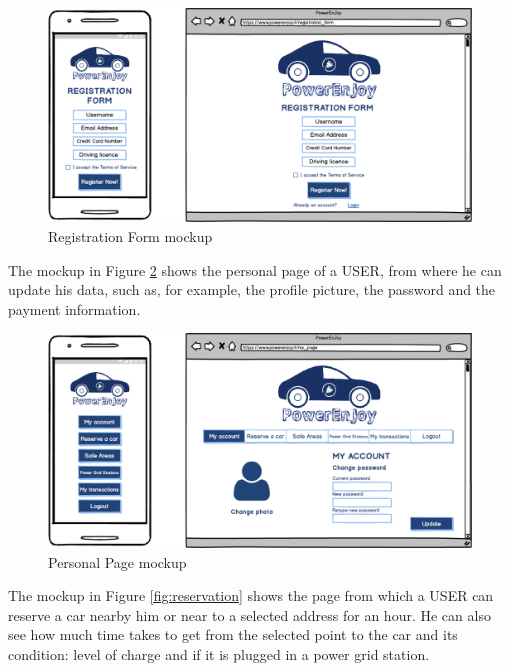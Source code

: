 \vspace{80pt}

\begin{figure}[htbp]
\centering
\includegraphics[width=\textwidth]{Images/Mockups/RegistrationForm}
\caption{Registration Form mockup}
\label{fig:registration}
\end{figure}
\clearpage

\newline
The mockup in Figure \ref{fig:mypage} shows the personal page of a USER, from where he can update his data, such as, for example, the profile picture, the password and the payment information.

\vspace{80pt}

\begin{figure}[htbp]
\centering
\includegraphics[width=\textwidth]{Images/Mockups/MyPage}
\caption{Personal Page mockup}
\label{fig:mypage}
\end{figure}
\clearpage

\newline
The mockup in Figure \ref{fig:reservation} shows the page from which a USER can reserve a car nearby him or near to a selected address for an hour.
He can also see how much time takes to get from the selected point to the car and its condition: level of charge and if it is plugged in a power grid station.

